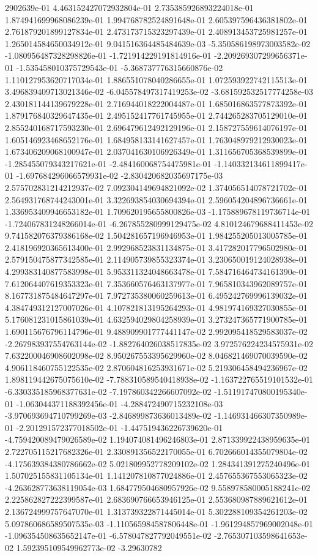 2902639e-01	4.463152427072932804e-01	2.735385926893224018e-01	1.874941699968086239e-01	1.994768782524891648e-01	2.605397596436381802e-01	2.761879201899127834e-01	2.473173715323297439e-01	2.408913453725981257e-01	1.265014584650034912e-01	9.041516364485484639e-03	-5.350586198973003582e-02	-1.080956487328298826e-01	-1.721914229191814916e-01	-2.209269307299656371e-01	-1.535458010375729543e-01	-5.368737776315660876e-02	1.110127953620717034e-01	1.886551078040286655e-01	1.072593922742115513e-01	3.496839409713021346e-02	-6.045578497317419253e-02	-3.681592532517774258e-03	2.430181144139679228e-01	2.716944018222004487e-01	1.685016863577873392e-01	1.879176840329647435e-01	2.495152417761745955e-01	2.744265283705129010e-01	2.855240168717593230e-01	2.696479612492129196e-01	2.158727559614076197e-01	1.605146923468652176e-01	1.684958133141627457e-01	1.763048979212930023e-01	1.673406209068100947e-01	2.037041630106926349e-01	1.311656705368539899e-01	-1.285455079343217621e-01	-2.484160068754475981e-01	-1.140332134611899417e-01	-1.697684296066579931e-02	-2.830420682035697175e-03	2.575702831214212937e-02	7.092304149694821092e-02	1.374056514078721702e-01	2.564931768744243001e-01	3.322693854030694394e-01	2.596054204896736661e-01	1.336953409946653182e-01	1.709620195655800826e-03	-1.175889678119736714e-01	-1.724067831248266014e-01	-6.267855280999129475e-02	4.810124679688411453e-02	9.741582076379386168e-02	1.504281657196946953e-01	1.984255205013005785e-01	2.418196920365613400e-01	2.992968523831134875e-01	3.417282017796502980e-01	2.579150475877342585e-01	2.114905739855323374e-01	3.230650019124028938e-01	4.299383140877583998e-01	5.953311324048663478e-01	7.584716464734161390e-01	7.612064407619353323e-01	7.353660576463137977e-01	7.965810343962089757e-01	8.167731875484647297e-01	7.972735380060259613e-01	6.495242769996139032e-01	4.384749312127007026e-01	4.107821813195264293e-01	4.981974169327030855e-01	5.176081231015861039e-01	4.632594029804258939e-01	3.273247365771900785e-01	1.690115676796114796e-01	9.488909901777441147e-02	2.992095418529583037e-02	-2.267983937554763144e-02	-1.882764026038517835e-02	3.972576224234575931e-02	7.632200046908602098e-02	8.950267553395629960e-02	8.046821469070039590e-02	4.906118460755122535e-02	2.870604816253931671e-02	5.219306458494236967e-02	1.898119442675075610e-02	-7.788310589540418938e-02	-1.163722765519101532e-01	-6.330335185968377631e-02	-7.197860342266607092e-02	-1.511917470800195340e-01	-1.063044371188392456e-01	-4.288472490715232108e-03	-3.970693694710799269e-03	-2.846899873636013489e-02	-1.146931466307350989e-01	-2.201291572377018502e-01	-1.447519436226739620e-01	-4.759420089479026589e-02	1.194074081496246803e-01	2.871339922438959635e-01	2.722705115217682326e-01	2.330891356522170055e-01	6.702666014355079804e-02	-4.175639384380786662e-02	5.021809952778209102e-02	1.284341391275240496e-01	1.507025155831105134e-01	1.141207810877024886e-01	2.457655367553065323e-02	-4.263628773638119054e-03	1.684779504680957926e-02	9.558978580005188241e-02	2.225862827222399587e-01	2.683690766653946125e-01	2.553680987889621612e-01	2.136724999757647070e-01	1.313739322871445014e-01	5.302288109354261203e-02	5.097860686589507535e-03	-1.110565984587806448e-01	-1.961294857969002048e-01	-1.096354508635652147e-01	-6.578047827792049551e-02	-2.765307103598641653e-02	1.592395109549962773e-02	-3.29630782